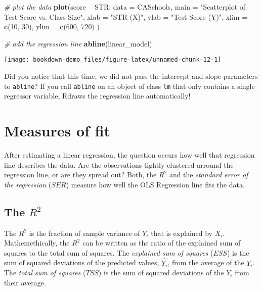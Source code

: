 \documentclass[]{book}
\newenvironment{Shaded}{\begin{snugshade}}{\end{snugshade}}
\newcommand{\KeywordTok}[1]{\textcolor[rgb]{0.13,0.29,0.53}{\textbf{#1}}}
\newcommand{\DataTypeTok}[1]{\textcolor[rgb]{0.13,0.29,0.53}{#1}}
\newcommand{\DecValTok}[1]{\textcolor[rgb]{0.00,0.00,0.81}{#1}}
\newcommand{\StringTok}[1]{\textcolor[rgb]{0.31,0.60,0.02}{#1}}
\newcommand{\CommentTok}[1]{\textcolor[rgb]{0.56,0.35,0.01}{\textit{#1}}}
\newcommand{\OperatorTok}[1]{\textcolor[rgb]{0.81,0.36,0.00}{\textbf{#1}}}
\newcommand{\NormalTok}[1]{#1}
\theoremstyle{definition}
\theoremstyle{definition}
\theoremstyle{definition}
\theoremstyle{remark}
\begin{document}
\begin{Shaded}
\begin{Highlighting}[]
\CommentTok{# plot the data}
\KeywordTok{plot}\NormalTok{(score }\OperatorTok{~}\StringTok{ }\NormalTok{STR, }
     \DataTypeTok{data =}\NormalTok{ CASchools,}
     \DataTypeTok{main =} \StringTok{"Scatterplot of Test Score vs. Class Size"}\NormalTok{, }
     \DataTypeTok{xlab =} \StringTok{"STR (X)"}\NormalTok{,}
     \DataTypeTok{ylab =} \StringTok{"Test Score (Y)"}\NormalTok{,}
     \DataTypeTok{xlim =} \KeywordTok{c}\NormalTok{(}\DecValTok{10}\NormalTok{, }\DecValTok{30}\NormalTok{),}
     \DataTypeTok{ylim =} \KeywordTok{c}\NormalTok{(}\DecValTok{600}\NormalTok{, }\DecValTok{720}\NormalTok{)}
\NormalTok{     )}

\CommentTok{# add the regression line}
\KeywordTok{abline}\NormalTok{(linear_model) }
\end{Highlighting}
\end{Shaded}

\begin{center}\texttt{[image: bookdown-demo\_files/figure-latex/unnamed-chunk-12-1]} \end{center}

Did you notice that this time, we did not pass the intercept and slope
parameters to \texttt{abline}? If you call \texttt{abline} on an object
of class \texttt{lm} that only contains a single regressor variable,
Rdraws the regression line automatically!

\section{Measures of fit}\label{measures-of-fit}

After estimating a linear regression, the question occurs how well that
regression line describes the data. Are the observations tightly
clustered arround the regression line, or are they spread out? Both, the
\(R^2\) and the \emph{standard error of the regression} (\(SER\))
measure how well the OLS Regression line fits the data.

\subsection{\texorpdfstring{The \(R^2\)}{The R\^{}2}}\label{the-r2}

The \(R^2\) is the fraction of sample variance of \(Y_i\) that is
explained by \(X_i\). Mathemethically, the \(R^2\) can be written as the
ratio of the explained sum of squares to the total sum of squares. The
\emph{explained sum of squares} (\(ESS\)) is the sum of squared
deviations of the predicted values, \(\hat{Y_i}\), from the average of
the \(Y_i\). The \emph{total sum of squares} (\(TSS\)) is the sum of
squared deviations of the \(Y_i\) from their average.
\end{document}
